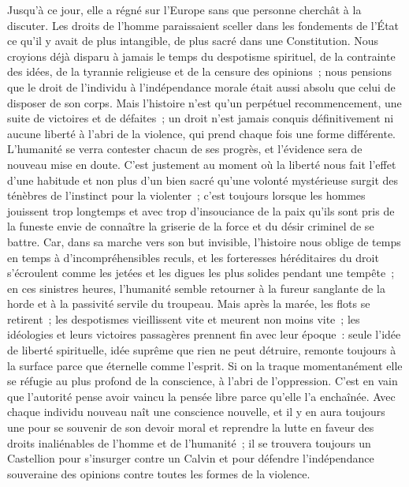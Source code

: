 \documentclass[french,twoside]{book} %
\newcommand{\dateline}[1]{\medskip{\RaggedLeft{#1}\par}\bigskip}
\newcommand\chapterclose{} %
\begin{document}
\noindent Jusqu’à ce jour, elle a régné sur l’Europe sans que personne cherchât à la discuter. Les droits de l’homme paraissaient sceller dans les fondements de l’État ce qu’il y avait de plus intangible, de plus sacré dans une Constitution. Nous croyions déjà disparu à jamais le temps du despotisme spirituel, de la contrainte des idées, de la tyrannie religieuse et de la censure des opinions ; nous pensions que le droit de l’individu à l’indépendance morale était aussi absolu que celui de disposer de son corps. Mais l’histoire n’est qu’un perpétuel recommencement, une suite de victoires et de défaites ; un droit n’est jamais conquis définitivement ni aucune liberté à l’abri de la violence, qui prend chaque fois une forme différente. L’humanité se verra contester chacun de ses progrès, et l’évidence sera de nouveau mise en doute. C’est justement au moment où la liberté nous fait l’effet d’une habitude et non plus d’un bien sacré qu’une volonté mystérieuse surgit des ténèbres de l’instinct pour la violenter ; c’est toujours lorsque les hommes jouissent trop longtemps et avec trop d’insouciance de la paix qu’ils sont pris de la funeste envie de connaître la griserie de la force et du désir criminel de se battre. Car, dans sa marche vers son but invisible, l’histoire nous oblige de temps en temps à d’incompréhensibles reculs, et les forteresses héréditaires du droit s’écroulent comme les jetées et les digues les plus solides pendant une tempête ; en ces sinistres heures, l’humanité semble retourner à la fureur sanglante de la horde et à la passivité servile du troupeau. Mais après la marée, les flots se retirent ; les despotismes vieillissent vite et meurent non moins vite ; les idéologies et leurs victoires passagères prennent fin avec leur époque : seule l’idée de liberté spirituelle, idée suprême que rien ne peut détruire, remonte toujours à la surface parce que éternelle comme l’esprit. Si on la traque momentanément elle se réfugie au plus profond de la conscience, à l’abri de l’oppression. C’est en vain que l’autorité pense avoir vaincu la pensée libre parce qu’elle l’a enchaînée. Avec chaque individu nouveau naît une conscience nouvelle, et il y en aura toujours une pour se souvenir de son devoir moral et reprendre la lutte en faveur des droits inaliénables de l’homme et de l’humanité ; il se trouvera toujours un Castellion pour s’insurger contre un Calvin et pour défendre l’indépendance souveraine des opinions contre toutes les formes de la violence.\par

\dateline{Avril 1936}
\chapterclose
\end{document}
